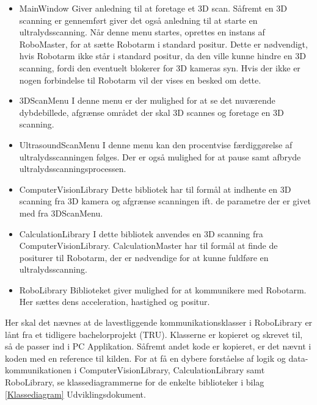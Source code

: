 \let\labelitemi\labelitemii
\begin{itemize}
\item{MainWindow}\newline
Giver anledning til at foretage et 3D scan. Såfremt en 3D scanning er gennemført giver det også anledning til at starte en ultralydsscanning. Når denne menu startes, oprettes en instans af RoboMaster, for at sætte Robotarm i standard positur. Dette er nødvendigt, hvis Robotarm ikke står i standard positur, da den ville kunne hindre en 3D scanning, fordi den eventuelt blokerer for 3D kameras syn.
Hvis der ikke er nogen forbindelse til Robotarm vil der vises en besked om dette.

\item{3DScanMenu}\newline
I denne menu er der mulighed for at se det nuværende dybdebillede, afgrænse området der skal 3D scannes og foretage en 3D scanning.

\item{UltrasoundScanMenu}\newline
I denne menu kan den procentvise færdiggørelse af ultralydsscanningen følges. Der er også mulighed for at pause samt afbryde ultralydsscanningsprocessen.

\item{ComputerVisionLibrary}\newline
Dette bibliotek har til formål at indhente en 3D scanning fra 3D kamera og afgrænse scanningen ift. de parametre der er givet med fra 3DScanMenu.

\item{CalculationLibrary}\newline
I dette bibliotek anvendes en 3D scanning fra ComputerVisionLibrary. CalculationMaster har til formål at finde de positurer til Robotarm, der er nødvendige for at kunne fuldføre en ultralydsscanning.

\item{RoboLibrary}\newline
Biblioteket giver mulighed for at kommunikere med Robotarm. Her sættes dens acceleration, hastighed og positur.
\end{itemize}

Her skal det nævnes at de lavestliggende kommunikationsklasser i RoboLibrary er lånt fra et tidligere bachelorprojekt (TRU). Klasserne er kopieret og skrevet til, så de passer ind i PC Applikation. Såfremt andet kode er kopieret, er det nævnt i koden med en reference til kilden.
For at få en dybere forståelse af logik og data-kommunikationen i ComputerVisionLibrary, CalculationLibrary samt RoboLibrary, se klassediagrammerne for de enkelte biblioteker i bilag \ref{Klassediagram} Udviklingsdokument. 
\newpage

